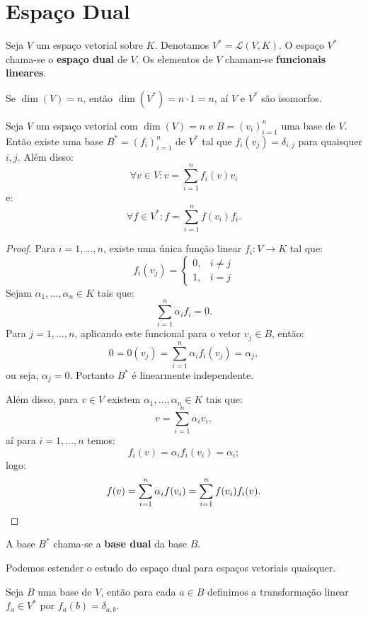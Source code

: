 \documentclass[11pt,twoside,a4paper]{book}
\begin{document}
\section{Espaço Dual}

\begin{definicao}
Seja $V$ um espaço vetorial sobre $K$. Denotamos $V^*=\mathcal{L}(V,K)$. O espaço $V^*$ chama-se o \textbf{espaço dual} de $V$. Os elementos de $V$ chamam-se \textbf{funcionais lineares}.
\end{definicao}

\noindent
Se $\dim(V)=n$, então $\dim(V^*)=n\cdot 1=n$, aí $V$ e $V^*$ são isomorfos.

\begin{teorema}\label{basedual}
Seja $V$ um espaço vetorial com $\dim(V)=n$ e $B=(v_i)_{i=1}^n$ uma base de $V$. Então existe uma base $B^*=(f_i)_{i=1}^n$ de $V^*$ tal que $f_i(v_j)=\delta_{i,j}$ para quaisquer $i,j$. Além disso:
\[
\forall v\in V:v=\sum_{i=1}^nf_i(v)v_i
\]
e:
\[
\forall f\in V^*:f=\sum_{i=1}^nf(v_i)f_i.
\]
\end{teorema}
\begin{proof}
Para $i=1,\dots,n$, existe uma única função linear $f_i:V\rightarrow K$ tal que:
\[
f_i(v_j)=\left\{\begin{array}{rl}0,&i\neq j\\1,&i=j\end{array}\right.
\]
Sejam $\alpha_1,\dots,\alpha_n\in K$ tais que:
\[
\sum_{i=1}^n\alpha_if_i=0.
\]
Para $j=1,\dots,n$, aplicando este funcional para o vetor $v_j\in B$, então:
\[
0=0(v_j)=\sum_{i=1}^n\alpha_if_i(v_j)=\alpha_j,
\]
ou seja, $\alpha_j=0$. Portanto $B^*$ é linearmente independente.

\medskip
\noindent
Além disso, para $v\in V$ existem $\alpha_1,\dots,\alpha_n\in K$ tais que:
\[
v=\sum_{i=1}^n\alpha_iv_i,
\]
aí para $i=1,\dots,n$ temos:
\[
f_i(v)=\alpha_if_i(v_i)=\alpha_i;
\]
logo:
\[
f(v)=\sum_{i=1}^n\alpha_if(v_i)=\sum_{i=1}^nf(v_i)f_i(v). \qedhere
\] 
\end{proof}

\begin{definicao}
A base $B^*$ chama-se a \textbf{base dual} da base $B$.
\end{definicao}

\noindent
Podemos estender o estudo do espaço dual para espaços vetoriais quaisquer.

\begin{definicao}
Seja $B$ uma base de $V$, então para cada $a\in B$ definimos a transformação linear $f_a\in V^*$ por $f_a(b)=\delta_{a,b}$.
\end{definicao}
\end{document}
